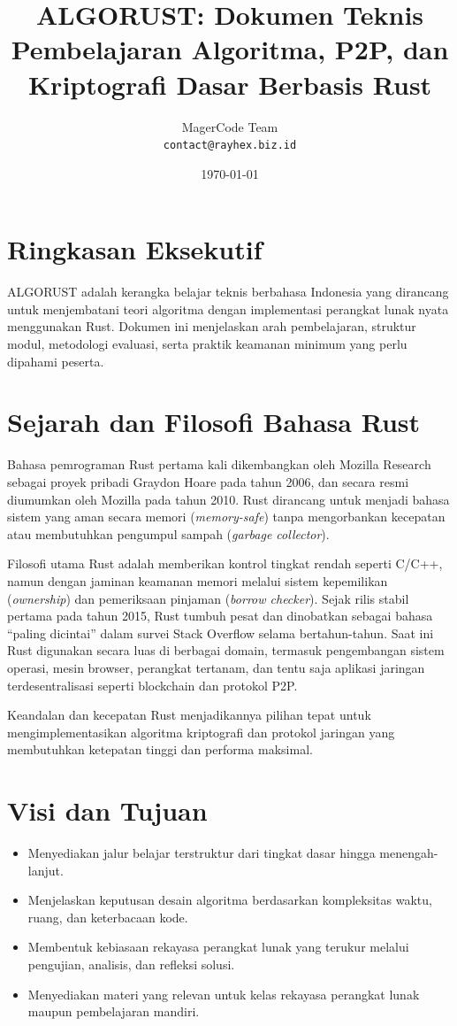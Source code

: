 \documentclass{article}
\title{ALGORUST: Dokumen Teknis Pembelajaran Algoritma, P2P, dan Kriptografi Dasar Berbasis Rust}
\author{MagerCode Team \\ \small \texttt{contact@rayhex.biz.id}}
\date{\today}
\begin{document}
\maketitle

\section{Ringkasan Eksekutif}
ALGORUST adalah kerangka belajar teknis berbahasa Indonesia yang dirancang untuk menjembatani teori
algoritma dengan implementasi perangkat lunak nyata menggunakan Rust. Dokumen ini menjelaskan
arah pembelajaran, struktur modul, metodologi evaluasi, serta praktik keamanan minimum
yang perlu dipahami peserta.

\section{Sejarah dan Filosofi Bahasa Rust}
Bahasa pemrograman Rust pertama kali dikembangkan oleh Mozilla Research sebagai proyek pribadi
Graydon Hoare pada tahun 2006, dan secara resmi diumumkan oleh Mozilla pada tahun 2010.
Rust dirancang untuk menjadi bahasa sistem yang aman secara memori (\textit{memory-safe}) tanpa
mengorbankan kecepatan atau membutuhkan pengumpul sampah (\textit{garbage collector}).

Filosofi utama Rust adalah memberikan kontrol tingkat rendah seperti C/C++, namun dengan jaminan
keamanan memori melalui sistem kepemilikan (\textit{ownership}) dan pemeriksaan pinjaman (\textit{borrow checker}).
Sejak rilis stabil pertama pada tahun 2015, Rust tumbuh pesat dan dinobatkan sebagai bahasa
``paling dicintai'' dalam survei Stack Overflow selama bertahun-tahun. Saat ini Rust digunakan
secara luas di berbagai domain, termasuk pengembangan sistem operasi, mesin browser, perangkat
tertanam, dan tentu saja aplikasi jaringan terdesentralisasi seperti blockchain dan protokol P2P.

Keandalan dan kecepatan Rust menjadikannya pilihan tepat untuk mengimplementasikan algoritma
kriptografi dan protokol jaringan yang membutuhkan ketepatan tinggi dan performa maksimal.

\section{Visi dan Tujuan}
\begin{itemize}
  \item Menyediakan jalur belajar terstruktur dari tingkat dasar hingga menengah-lanjut.
  \item Menjelaskan keputusan desain algoritma berdasarkan kompleksitas waktu, ruang, dan keterbacaan kode.
  \item Membentuk kebiasaan rekayasa perangkat lunak yang terukur melalui pengujian, analisis, dan refleksi solusi.
  \item Menyediakan materi yang relevan untuk kelas rekayasa perangkat lunak maupun pembelajaran mandiri.
\end{itemize}
\end{document}
